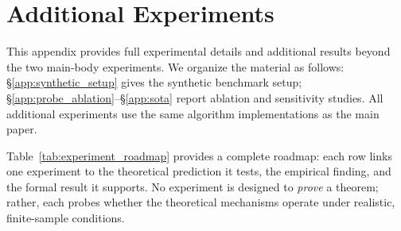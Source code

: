 \documentclass{article}
\begin{document}
\section{Additional Experiments}
\label{app:additional_experiments}


This appendix provides full experimental details and additional results
beyond the two main-body experiments.
We organize the material as follows:
\S\ref{app:synthetic_setup} gives the synthetic benchmark setup;
\S\ref{app:probe_ablation}--\S\ref{app:sota} report ablation and
sensitivity studies.
All additional experiments use the same algorithm implementations as
the main paper.

Table~\ref{tab:experiment_roadmap} provides a complete roadmap: each row links one experiment to the theoretical prediction it
  tests, the empirical finding, and the formal result it supports. No experiment is designed to \emph{prove} a theorem; rather, each
  probes whether the theoretical mechanisms operate under realistic, finite-sample conditions.
\end{document}
